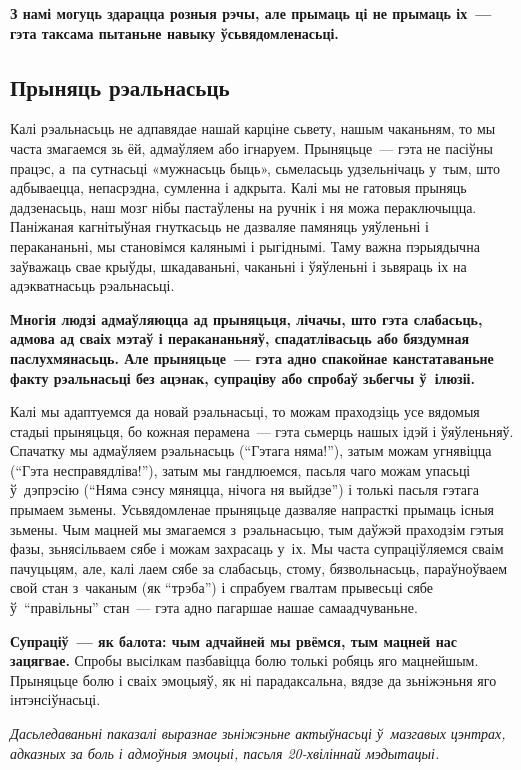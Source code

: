 \textbf{З намі могуць здарацца розныя рэчы, але прымаць ці не прымаць іх~--- гэта таксама пытаньне навыку ўсьвядомленасьці.}

\subsection*{Прыняць рэальнасьць}

Калі рэальнасьць не адпавядае нашай карціне сьвету, нашым чаканьням, то мы часта змагаемся зь ёй, адмаўляем або ігнаруем. Прыняцьце~--- гэта не пасіўны працэс, а~па сутнасьці «мужнасьць быць», сьмеласьць удзельнічаць у~тым, што адбываецца, непасрэдна, сумленна і адкрыта. Калі мы не гатовыя прыняць дадзенасьць, наш мозг нібы пастаўлены на ручнік і ня можа пераключыцца. Паніжаная кагнітыўная гнуткасьць не дазваляе памяняць уяўленьні і перакананьні, мы становімся калянымі і рыгіднымі. Таму важна пэрыядычна заўважаць свае крыўды, шкадаваньні, чаканьні і ўяўленьні і зьвяраць іх на адэкватнасьць рэальнасьці.

\textbf{Многія людзі адмаўляюцца ад прыняцьця, лічачы, што гэта слабасьць, адмова ад сваіх мэтаў і перакананьняў, спадатлівасьць або бяздумная паслухмянасьць. Але прыняцьце~--- гэта адно спакойнае канстатаваньне факту рэальнасьці без ацэнак, супраціву або спробаў зьбегчы ў~ілюзіі.}

Калі мы адаптуемся да новай рэальнасьці, то можам праходзіць усе вядомыя стадыі прыняцьця, бо кожная перамена~--- гэта сьмерць нашых ідэй і ўяўленьняў. Спачатку мы адмаўляем рэальнасьць (``Гэтага няма!''), затым можам угнявіцца (``Гэта несправядліва!''), затым мы гандлюемся, пасьля чаго можам упасьці ў~дэпрэсію (``Няма сэнсу мяняцца, нічога ня выйдзе'') і толькі пасьля гэтага прымаем зьмены. Усьвядомленае прыняцьце дазваляе напрасткі прымаць існыя зьмены. Чым мацней мы змагаемся з~рэальнасьцю, тым даўжэй праходзім гэтыя фазы, зьнясільваем сябе і можам захрасаць у~іх. Мы часта супраціўляемся сваім пачуцьцям, але, калі лаем сябе за слабасьць, стому, бязвольнасьць, параўноўваем свой стан з~чаканым (як ``трэба'') і спрабуем гвалтам прывесьці сябе ў~``правільны'' стан~--- гэта адно пагаршае нашае самаадчуваньне.

\textbf{Супраціў~--- як балота: чым адчайней мы рвёмся, тым мацней нас зацягвае.} Спробы высілкам пазбавіцца болю толькі робяць яго мацнейшым. Прыняцьце болю і сваіх эмоцыяў, як ні парадаксальна, вядзе да зьніжэньня яго інтэнсіўнасьці.

\emph{Дасьледаваньні паказалі выразнае зьніжэньне актыўнасьці ў~мазгавых цэнтрах, адказных за боль і адмоўныя эмоцыі, пасьля 20-хвіліннай мэдытацыі.}

